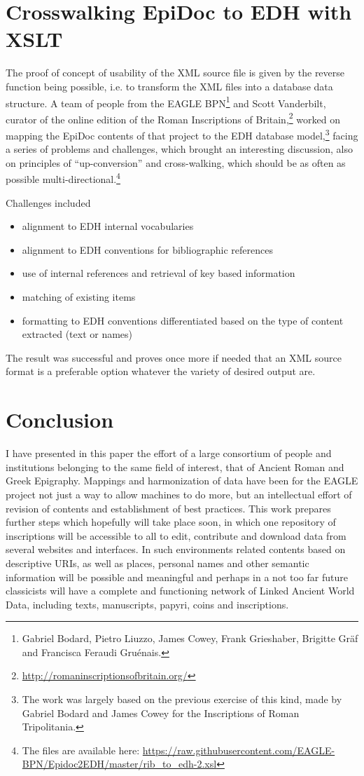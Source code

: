 \documentclass[amsthm,ebook]{saparticle}
\begin{document}
\section{Crosswalking EpiDoc to EDH with XSLT}
The proof of concept of usability of the XML source file is given by the reverse function being possible, i.e. to transform the XML files into a database data structure. A team of people from the EAGLE BPN\footnote{Gabriel Bodard, Pietro Liuzzo, James Cowey, Frank Grieshaber, Brigitte Gräf and Francisca Feraudi Gruénais.} and Scott Vanderbilt, curator of the online edition of the Roman Inscriptions of Britain,\footnote{\url{http://romaninscriptionsofbritain.org/}} worked on mapping the EpiDoc contents of that project to the EDH database model,\footnote{The work was largely based on the previous exercise of this kind, made by Gabriel Bodard and James Cowey for the Inscriptions of Roman Tripolitania.} facing a series of problems and challenges, which brought an interesting discussion, also on principles of ``up-conversion'' and cross-walking, which should be as often as possible multi-directional.\footnote{The files are available here: \url{https://raw.githubusercontent.com/EAGLE-BPN/Epidoc2EDH/master/rib_to_edh-2.xsl}}

Challenges included
\begin{itemize}
\item alignment to EDH internal vocabularies
\item alignment to EDH conventions for bibliographic references
\item use of internal references and retrieval of key based information
\item matching of existing items
\item formatting to EDH conventions differentiated based on the type of content extracted (text or names) 
\end{itemize}

The result was successful and proves once more if needed that an XML source format is a preferable option whatever the variety of desired output are.

\section{Conclusion}
I have presented in this paper the effort of a large consortium of people and institutions belonging to the same field of interest, that of Ancient Roman and Greek Epigraphy.
Mappings and harmonization of data have been for the EAGLE project not just a way to allow machines to do more, but an intellectual effort of revision of contents and establishment of best practices. This work prepares further steps which hopefully will take place soon, in which one repository of inscriptions will be accessible to all to edit, contribute and download data from several websites and interfaces. In such environments related contents based on descriptive URIs, as well as places, personal names and other semantic information will be possible and meaningful and perhaps in a not too far future classicists will have a complete and functioning network of Linked Ancient World Data, including texts, manuscripts, papyri, coins and inscriptions. 



\end{document}
